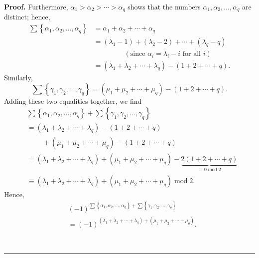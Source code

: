 \documentclass[numbers=enddot,12pt,final,onecolumn,notitlepage]{scrartcl}%
\theoremstyle{definition}
\newenvironment{proof}[1][Proof]{\noindent\textbf{#1.} }{\ \rule{0.5em}{0.5em}}
\let\sumnonlimits\sum
\renewcommand{\sum}{\sumnonlimits\limits}
\begin{document}
\begin{enumerate}
\begin{proof}
Furthermore, $\alpha_{1}>\alpha_{2}>\cdots>\alpha_{q}$ shows that the numbers
$\alpha_{1},\alpha_{2},\ldots,\alpha_{q}$ are distinct; hence,%
\begin{align*}
\sum\left\{  \alpha_{1},\alpha_{2},\ldots,\alpha_{q}\right\}   &  =\alpha
_{1}+\alpha_{2}+\cdots+\alpha_{q}\\
&  =\left(  \lambda_{1}-1\right)  +\left(  \lambda_{2}-2\right)
+\cdots+\left(  \lambda_{q}-q\right) \\
&  \ \ \ \ \ \ \ \ \ \ \ \ \ \ \ \ \ \ \ \ \left(  \text{since }\alpha
_{i}=\lambda_{i}-i\text{ for all }i\right) \\
&  =\left(  \lambda_{1}+\lambda_{2}+\cdots+\lambda_{q}\right)  -\left(
1+2+\cdots+q\right)  .
\end{align*}
Similarly,%
\[
\sum\left\{  \gamma_{1},\gamma_{2},\ldots,\gamma_{q}\right\}  =\left(  \mu
_{1}+\mu_{2}+\cdots+\mu_{q}\right)  -\left(  1+2+\cdots+q\right)  .
\]
Adding these two equalities together, we find%
\begin{align*}
&  \sum\left\{  \alpha_{1},\alpha_{2},\ldots,\alpha_{q}\right\}  +\sum\left\{
\gamma_{1},\gamma_{2},\ldots,\gamma_{q}\right\} \\
&  =\left(  \lambda_{1}+\lambda_{2}+\cdots+\lambda_{q}\right)  -\left(
1+2+\cdots+q\right) \\
&  \ \ \ \ \ \ \ \ \ \ +\left(  \mu_{1}+\mu_{2}+\cdots+\mu_{q}\right)
-\left(  1+2+\cdots+q\right) \\
&  =\left(  \lambda_{1}+\lambda_{2}+\cdots+\lambda_{q}\right)  +\left(
\mu_{1}+\mu_{2}+\cdots+\mu_{q}\right)  -\underbrace{2\left(  1+2+\cdots
+q\right)  }_{\equiv0\operatorname{mod}2}\\
&  \equiv\left(  \lambda_{1}+\lambda_{2}+\cdots+\lambda_{q}\right)  +\left(
\mu_{1}+\mu_{2}+\cdots+\mu_{q}\right)  \operatorname{mod}2.
\end{align*}
Hence,%
\begin{align}
&  \left(  -1\right)  ^{\sum\left\{  \alpha_{1},\alpha_{2},\ldots,\alpha
_{q}\right\}  +\sum\left\{  \gamma_{1},\gamma_{2},\ldots,\gamma_{q}\right\}
}\nonumber\\
&  =\left(  -1\right)  ^{\left(  \lambda_{1}+\lambda_{2}+\cdots+\lambda
_{q}\right)  +\left(  \mu_{1}+\mu_{2}+\cdots+\mu_{q}\right)  }.
\label{p17.lemA5.pf.7}%
\end{align}



\end{proof}
\end{enumerate}
\end{document}
